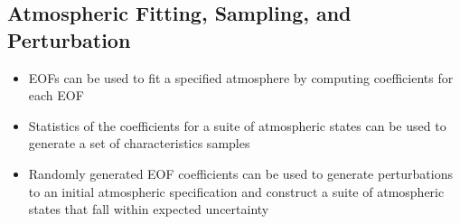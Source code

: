 \documentclass[letterpaper,10pt,english]{sphinxmanual}
\begin{document}
\subsection{Atmospheric Fitting, Sampling, and Perturbation}
\label{\detokenize{analysis:sampling}}\begin{itemize}
\item {} 
EOFs can be used to fit a specified atmosphere by computing coefficients for each EOF

\item {} 
Statistics of the coefficients for a suite of atmospheric states can be used to generate a set of characteristics samples

\item {} 
Randomly generated EOF coefficients can be used to generate perturbations to an initial atmospheric specification and construct a suite of atmospheric states that fall within expected uncertainty

\end{itemize}
\end{document}

